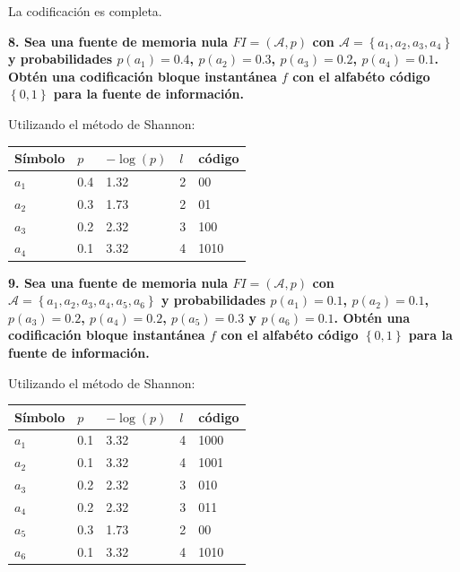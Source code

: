 \documentclass{article}
\begin{document}
La codificación es completa.

\pagebreak

\textbf{
8. Sea una fuente de memoria nula $FI=\left(\mathcal{A},p\right)$ con $\mathcal{A}=\left\{a_1,a_2,a_3,a_4\right\}$ y probabilidades $p(a_1)=0.4$, $p(a_2)=0.3$, $p(a_3)=0.2$, $p(a_4)=0.1$. Obtén una codificación bloque instantánea $f$ con el alfabéto código $\left\{0,1\right\}$ para la fuente de información.
}

\vspace{0.5cm}

Utilizando el método de Shannon:

\begin{table}[htbp!]
    \centering
    \begin{tabular}{|l|l|l|l|l|}
    \hline
    Símbolo & $p$ & $-\log\left(p\right)$ & $l$ & código \\
    \hline
    $a_1$ & 0.4 & 1.32 & 2 & 00 \\
    $a_2$ & 0.3 & 1.73 & 2 & 01 \\
    $a_3$ & 0.2 & 2.32 & 3 & 100 \\
    $a_4$ & 0.1 & 3.32 & 4 & 1010 \\
    \hline
    \end{tabular}    
\end{table}

\vspace{1cm}

\textbf{
9. Sea una fuente de memoria nula $FI=\left(\mathcal{A},p\right)$ con $\mathcal{A}=\left\{a_1,a_2,a_3,a_4,a_5,a_6\right\}$ y probabilidades $p(a_1)=0.1$, $p(a_2)=0.1$, $p(a_3)=0.2$, $p(a_4)=0.2$, $p(a_5)=0.3$ y $p(a_6)=0.1$. Obtén una codificación bloque instantánea $f$ con el alfabéto código $\left\{0,1\right\}$ para la fuente de información.
}

\vspace{0.5cm}

Utilizando el método de Shannon:	

\begin{table}[htbp!]
    \centering
    \begin{tabular}{|l|l|l|l|l|}
    \hline
    Símbolo & $p$ & $-\log\left(p\right)$ & $l$ & código \\
    \hline
    $a_1$ & 0.1 & 3.32 & 4 & 1000 \\
    $a_2$ & 0.1 & 3.32 & 4 & 1001 \\
    $a_3$ & 0.2 & 2.32 & 3 & 010 \\
    $a_4$ & 0.2 & 2.32 & 3 & 011 \\
    $a_5$ & 0.3 & 1.73 & 2 & 00 \\
    $a_6$ & 0.1 & 3.32 & 4 & 1010 \\
    \hline
    \end{tabular}
\end{table}
\end{document}

